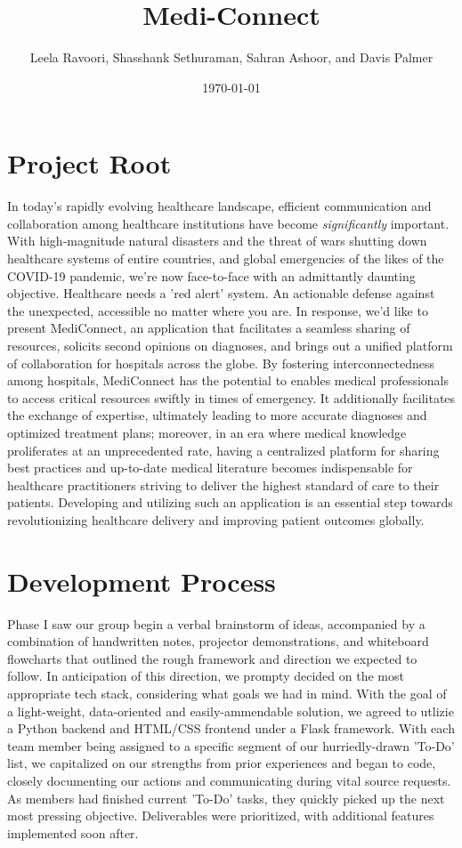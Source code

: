 \documentclass{article}
\title{Medi-Connect}
\author{Leela Ravoori, Shasshank Sethuraman, Sahran Ashoor, and Davis Palmer}
\date{\today}
\begin{document}
\maketitle

\section*{Project Root}

In today's rapidly evolving healthcare landscape, efficient communication and collaboration among healthcare 
institutions have become \emph{significantly} important. With high-magnitude natural disasters and the threat
of wars shutting down healthcare systems of entire countries, and global emergencies of the likes of the
COVID-19 pandemic, we're now face-to-face with an admittantly daunting objective. Healthcare needs a 
'red alert' system. An actionable defense against the unexpected, accessible no matter where you are. In 
response, we'd like to present MediConnect, an application that facilitates a seamless sharing of 
resources, solicits second opinions on diagnoses, and brings out a unified platform of collaboration for
hospitals across the globe. By fostering interconnectedness among hospitals, MediConnect has the potential to
enables medical professionals to access critical resources swiftly in times of emergency. It additionally 
facilitates the exchange of expertise, ultimately leading to more accurate diagnoses and optimized treatment 
plans; moreover, in an era where medical knowledge proliferates at an unprecedented rate, having a centralized 
platform for sharing best practices and up-to-date medical literature becomes indispensable for healthcare 
practitioners striving to deliver the highest standard of care to their patients. Developing and 
utilizing such an application is an essential step towards revolutionizing healthcare delivery and improving 
patient outcomes globally.

\section*{Development Process}

Phase I saw our group begin a verbal brainstorm of ideas, accompanied by a combination of handwritten notes, 
projector demonstrations, and whiteboard flowcharts that outlined the rough framework and direction we expected to follow.
In anticipation of this direction, we prompty decided on the most appropriate tech stack, considering what goals
we had in mind. With the goal of a light-weight, data-oriented and easily-ammendable solution, we agreed to utlizie
a Python backend and HTML/CSS frontend under a Flask framework. With each team member being assigned to a specific
segment of our hurriedly-drawn 'To-Do' list, we capitalized on our strengths from prior experiences and began to code,
closely documenting our actions and communicating during vital source requests. As members had finished current 'To-Do' tasks,
they quickly picked up the next most pressing objective. Deliverables were prioritized, with additional features
implemented soon after.
\end{document}
